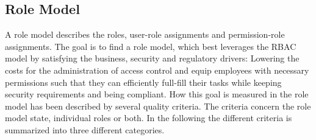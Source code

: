     \subsection{Role Model}
    A role model describes the roles, user-role assignments and permission-role assignments. The goal is to find a role model, which best leverages the RBAC model by satisfying the business, security and regulatory drivers: Lowering the costs for the administration of access control and equip employees with necessary permissions such that they can efficiently full-fill their tasks while keeping security requirements and being compliant.
    How this goal is measured in the role model has been described by several quality criteria\cite{Kunz}\cite{Frank}. The criteria concern the role model state, individual roles or both. In the following the different criteria is summarized into three different categories.
